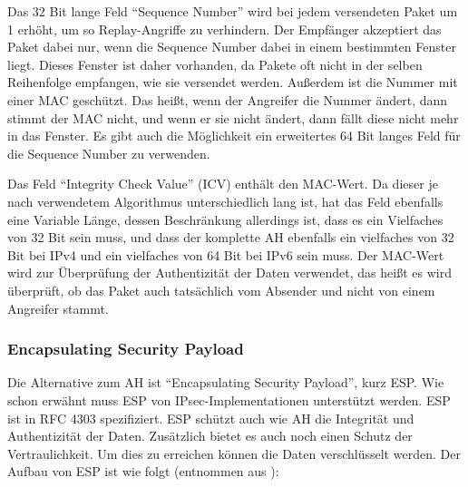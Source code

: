 \documentclass[12pt]{scrartcl}
\begin{document}
Das 32 Bit lange Feld "`Sequence Number"' wird bei jedem versendeten Paket um 1 erhöht, um so Replay-Angriffe zu verhindern. Der Empfänger akzeptiert das Paket dabei nur, wenn die Sequence Number dabei in einem bestimmten Fenster liegt. Dieses Fenster ist daher vorhanden, da Pakete oft nicht in der selben Reihenfolge empfangen, wie sie versendet werden. Außerdem ist die Nummer mit einer MAC geschützt. Das heißt, wenn der Angreifer die Nummer ändert, dann stimmt der MAC nicht, und wenn er sie nicht ändert, dann fällt diese nicht mehr in das Fenster. Es gibt auch die Möglichkeit ein erweitertes 64 Bit langes Feld für die Sequence Number zu verwenden. 

Das Feld "`Integrity Check Value"' (ICV) enthält den MAC-Wert. Da dieser je nach verwendetem Algorithmus unterschiedlich lang ist, hat das Feld ebenfalls eine Variable Länge, dessen Beschränkung allerdings ist, dass es ein Vielfaches von 32 Bit sein muss, und dass der komplette AH ebenfalls ein vielfaches von 32 Bit bei IPv4 und ein vielfaches von 64 Bit bei IPv6 sein muss. Der MAC-Wert wird zur Überprüfung der Authentizität der Daten verwendet, das heißt es wird überprüft, ob das Paket auch tatsächlich vom Absender und nicht von einem Angreifer stammt.

\subsubsection{Encapsulating Security Payload}
Die Alternative zum AH ist "`Encapsulating Security Payload"', kurz ESP. Wie schon erwähnt muss ESP von IPsec-Implementationen unterstützt werden. ESP ist in RFC 4303 spezifiziert.\cite{RFC4303}
ESP schützt auch wie AH die Integrität und Authentizität der Daten. Zusätzlich bietet es auch noch einen Schutz der Vertraulichkeit. Um dies zu erreichen können die Daten verschlüsselt werden. Der Aufbau von ESP ist wie folgt (entnommen aus \cite{RFC4303}):
\end{document}
